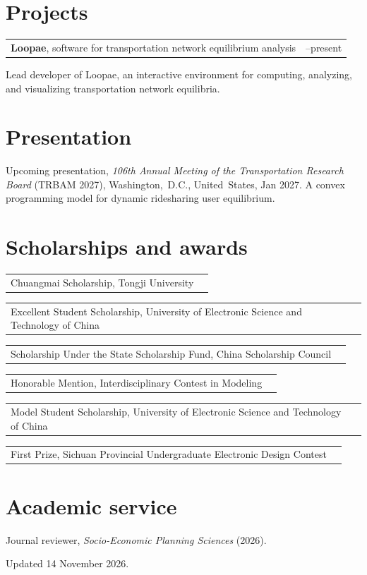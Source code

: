 \documentclass[11pt,letterpaper]{article}
\makeatletter
\newcommand{\dated}[2]{%
  \noindent\begin{tabularx}{\linewidth}{@{}X@{\hspace{9pt}}>{\raggedleft\arraybackslash}p{.24\linewidth}@{}}
  #1 & #2
  \end{tabularx}\par
}
\newcommand{\awardrow}[2]{%
  \noindent\begin{tabularx}{\linewidth}{@{}X@{\hspace{9pt}}>{\raggedleft\arraybackslash}p{.10\linewidth}@{}}
  #1 & #2
  \end{tabularx}\par
}
\makeatother
\begin{document}
\section*{Projects}
\dated{\textbf{Loopae}, software for transportation network equilibrium analysis}{2026--present}
Lead developer of Loopae, an interactive environment for computing, analyzing, and visualizing transportation network equilibria.

\section*{Presentation}
Upcoming presentation, \textit{106th Annual Meeting of the Transportation Research Board} (TRBAM 2027), \mbox{Washington, D.C.}, \mbox{United States}, Jan 2027. A convex programming model for dynamic ridesharing user equilibrium.

\section*{Scholarships and awards}
\awardrow{Chuangmai Scholarship, Tongji University}{2023}
\awardrow{Excellent Student Scholarship, University of Electronic Science and Technology of China}{2019}
\awardrow{Scholarship Under the State Scholarship Fund, China Scholarship Council}{2019}
\awardrow{Honorable Mention, Interdisciplinary Contest in Modeling}{2019}
\awardrow{Model Student Scholarship, University of Electronic Science and Technology of China}{2018}
\awardrow{First Prize, Sichuan Provincial Undergraduate Electronic Design Contest}{2018}

\section*{Academic service}
Journal reviewer, \textit{Socio-Economic Planning Sciences} (2026).

\vfill
{\footnotesize Updated 14 November 2026.}
\end{document}
